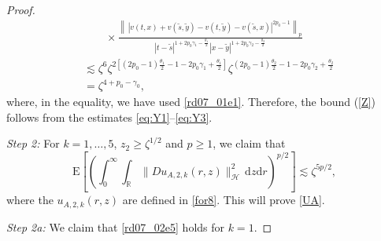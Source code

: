 \documentclass[10pt,a4paper]{amsart}
\newcommand {\deltah}{{\zeta}}
\newcommand{\E}{\mathrm{E}}
\newcommand{\R}{{\mathbb{R}}}
\renewcommand{\d}{\mathrm{d}}
\begin{document}
\begin{proof}
\begin{align}
                       &\qquad \times  
             \frac {\left\|\, |v(t,x)+v(\tilde{s},\tilde{y})-v(t,\tilde{y})-v(\tilde{s},x)|^{2p_0-1}\right\|_{p}
            }{|t-\tilde{s}|^{1+2p_0\gamma_1 -\frac{\theta_1}{2}}|x-\tilde{y}|^{1+2p_0\gamma_2-\frac{\theta_2}{2}}} \nonumber\\
            &\lesssim \deltah^{6}\deltah^{2\left[(2p_0-1)\frac{\theta_1}{2}-1-2p_0\gamma_1+\frac{\theta_1}{2}\right]}
            \deltah^{(2p_0-1)\frac{\theta_2}{2}-1-2p_0\gamma_2+\frac{\theta_2}{2}} \nonumber \\
            &= \deltah^{4+p_0-\gamma_0},  \nonumber
           \end{align}
where, in the equality, we have used \eqref{rd07_01e1}. Therefore, the bound  (\ref{Z})  follows from the estimates \eqref{eq:Y1}--\eqref{eq:Y3}.
  \medskip
  
 \noindent
 {\it Step 2:} For $k=1,\dots, 5$, $z_2 \geq \zeta^{1/2}$ and $p \geq 1$, we claim that 
 \begin{equation} \label{rd07_02e5}
           \E\left[\left(\int_0^\infty\int_\R \|Du_{A,2,k}(r,z)\|_\mathcal{H}^2\, \d z\d r\right)^{p/2}\right] \lesssim \deltah^{5p/2},
\end{equation}
 where the $u_{A,2,k}(r, z)$ are defined in \eqref{for8}. This will prove \eqref{UA}.
 
  \medskip
 \noindent
 {\it Step 2a:}  We claim that \eqref{rd07_02e5} holds for $k=1$.


\end{proof}
\end{document}
